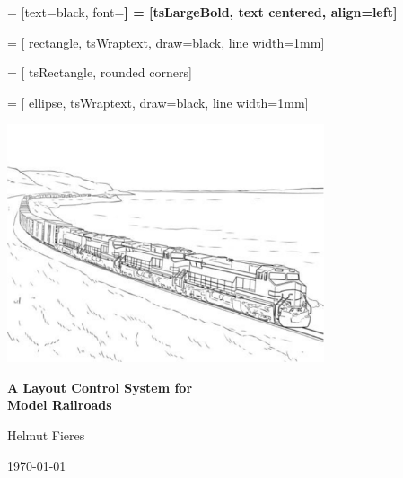 \documentclass[a4paper, 11pt]{book}
\begin{document}
    \newtoggle{includeListings}
    \togglefalse{includeListings} 

    \setlength{\emergencystretch}{3em}
    \raggedbottom

     = [text=black, font=\bfseries\large]
     = [tsLargeBold, text centered, align=left]

     = [  rectangle,
                                        tsWraptext,               
                                        draw=black,
                                        line width=1mm]

     = [  tsRectangle,
                                        rounded corners]

     = [   ellipse,
                                tsWraptext,
                                draw=black,
                                line width=1mm]

    \begin{center}
        \includegraphics[width=0.7\textwidth]{./figures/Frontpage-Picture.png}
        \vspace{ 2cm }
       
        {\Huge \textbf{A Layout Control System for \\ Model Railroads}} 
        \vspace{ 2cm }
       
        {\Large Helmut Fieres}

        {\large \today}
    \end{center}
\end{document}
